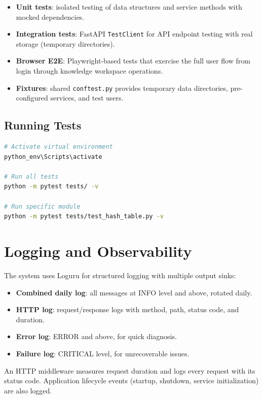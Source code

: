 \documentclass[12pt,a4paper]{article}
\begin{document}
\begin{itemize}[nosep]
    \item \textbf{Unit tests}: isolated testing of data structures and service methods with mocked dependencies.
    \item \textbf{Integration tests}: FastAPI \texttt{TestClient} for API endpoint testing with real storage (temporary directories).
    \item \textbf{Browser E2E}: Playwright-based tests that exercise the full user flow from login through knowledge workspace operations.
    \item \textbf{Fixtures}: shared \texttt{conftest.py} provides temporary data directories, pre-configured services, and test users.
\end{itemize}

\subsection{Running Tests}

\begin{lstlisting}[language=bash]
# Activate virtual environment
python_env\Scripts\activate

# Run all tests
python -m pytest tests/ -v

# Run specific module
python -m pytest tests/test_hash_table.py -v
\end{lstlisting}

\section{Logging and Observability}
\label{sec:logging}

The system uses Loguru for structured logging with multiple output sinks:

\begin{itemize}[nosep]
    \item \textbf{Combined daily log}: all messages at INFO level and above, rotated daily.
    \item \textbf{HTTP log}: request/response logs with method, path, status code, and duration.
    \item \textbf{Error log}: ERROR and above, for quick diagnosis.
    \item \textbf{Failure log}: CRITICAL level, for unrecoverable issues.
\end{itemize}

An HTTP middleware measures request duration and logs every request with its status code. Application lifecycle events (startup, shutdown, service initialization) are also logged.
\end{document}
